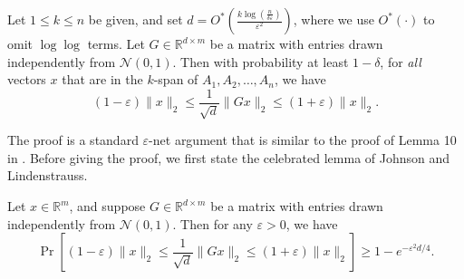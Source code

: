 \documentclass{article}
\newcommand{\eps}{\varepsilon}
\newcommand{\re}{\mathbb{R}}
\newcommand{\norm}[1]{\lVert #1 \rVert}
\newcommand{\calN}{\mathcal{N}}
\begin{document}
\begin{thm} \label{thm:random-projections}
Let $1\le k \le n$ be given, and set $d = O^*(\frac{k \log
(\frac{n}{\delta \eps})}{\eps^2})$, where we use $O^*(\cdot)$ to omit $\log \log$ terms.  Let $G \in \re^{d \times m}$ be a matrix with entries drawn independently from $\calN(0,1)$. Then with probability at least $1-\delta$,
for {\em all} vectors $x$ that are in the $k$-span of
$A_1, A_2, \dots, A_n$, we have
\[ (1-\eps)\norm{x}_2 \le \frac{1}{\sqrt{d}} \norm{Gx}_2 \le (1+\eps) \norm{x}_2. \]
\end{thm}

The proof is a standard $\eps$-net argument that is similar to the proof of Lemma 10 in \cite{Sarlos}. Before giving the proof, we first state the celebrated lemma of Johnson and Lindenstrauss.
\begin{thm}\label{thm:jl-classic}\cite{Johnson}
Let $x \in \re^m$, and suppose $G \in \re^{d\times m}$ be a matrix with entries drawn independently from $\calN(0,1)$.  Then for any $\eps > 0$, we have \[ \Pr\left[ (1-\eps)\norm{x}_2 \le \frac{1}{\sqrt{d}} \norm{Gx}_2 \le (1+\eps) \norm{x}_2 \right] \ge 1- e^{-\eps^2d/4}. \]
\end{thm}
\end{document}
